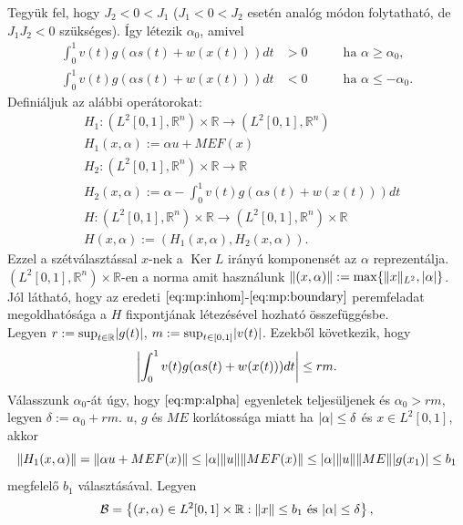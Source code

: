 \documentclass[oneside, titlepage, 12pt, a4paper]{report}
\DeclareMathOperator{\Ker}{Ker}	%
\DeclarePairedDelimiter\norm{\lVert}{\rVert}	%
\DeclarePairedDelimiter\abs{\lvert}{\rvert}	%
\begin{document}
Tegyük fel, hogy $J_2 < 0 < J_1$ ($J_1 < 0 < J_2$ esetén analóg módon folytatható, de $J_1 J_2 < 0$ szükséges). Így létezik $\alpha_0$, amivel
\begin{align}
\int_0^1 v(t) g(\alpha s(t) + w(x(t))) dt &> 0 \qquad &\text{ha } \alpha \geq \alpha_0, \label{eq:mp:alpha} \\
\int_0^1 v(t) g(\alpha s(t) + w(x(t))) dt &< 0 \qquad &\text{ha } \alpha \leq -\alpha_0. \nonumber
\end{align}
Definiáljuk az alábbi operátorokat:
\begin{align*}
&H_1 : ( L^2[0, 1], \mathbb{R}^n) \times \mathbb{R} \rightarrow ( L^2[0, 1], \mathbb{R}^n) \\
&H_1(x, \alpha) := \alpha u + M E F (x) \\
&H_2 :  ( L^2[0, 1], \mathbb{R}^n) \times \mathbb{R} \rightarrow \mathbb{R} \\
&H_2(x, \alpha) := \alpha - \int_0^1 v(t) g(\alpha s(t) + w(x(t))) dt \\
&H : ( L^2[0, 1], \mathbb{R}^n) \times \mathbb{R} \rightarrow ( L^2[0, 1], \mathbb{R}^n) \times \mathbb{R} \\
&H(x, \alpha) := (H_1 (x, \alpha), H_2(x, \alpha)).
\end{align*}
Ezzel a szétválasztással $x$-nek a $\Ker L$ irányú komponensét az $\alpha$ reprezentálja. $( L^2[0, 1], \mathbb{R}^n) \times \mathbb{R}$-en a norma amit használunk $\norm{(x, \alpha)} := \max \{ \norm{x}_{L^2}, \abs{\alpha} \}$. Jól látható, hogy az eredeti $\eqref{eq:mp:inhom}$-$\eqref{eq:mp:boundary}$ peremfeladat megoldhatósága a $H$ fixpontjának létezésével hozható összefüggésbe. \\
Legyen $r := \sup_{t \in \mathbb{R}} \abs{g(t)}$, $m := \sup_{t \in [0, 1]} \abs{v(t)}$. Ezekből következik, hogy
\begin{equation*}
\abs*{ \int_0^1 v(t) g(\alpha s(t) + w(x(t))) dt} \leq rm.
\end{equation*}
Válasszunk $\alpha_0$-át úgy, hogy $\eqref{eq:mp:alpha}$ egyenletek teljesüljenek és $\alpha_0 > rm$, legyen $\delta := \alpha_0 + rm$. $u$, $g$ és $M E$ korlátossága miatt ha $\abs{\alpha} \leq \delta$ és $x \in L^2[0, 1]$, akkor
\begin{equation*}
\norm{H_1 (x, \alpha)} = \norm{ \alpha u + M E F (x)} \leq \abs{\alpha} \norm{u} \norm{M E F (x)} \leq \abs{\alpha} \norm{u} \norm{M E} \abs{g(x_1)} \leq b_1
\end{equation*}
megfelelő $b_1$ választásával. Legyen
\begin{equation*}
\mathcal{B} = \left\{ (x, \alpha) \in L^2[0, 1] \times \mathbb{R} : \norm{x} \leq b_1 \text{ és } \abs{\alpha} \leq \delta \right\},
\end{equation*}
\end{document}
